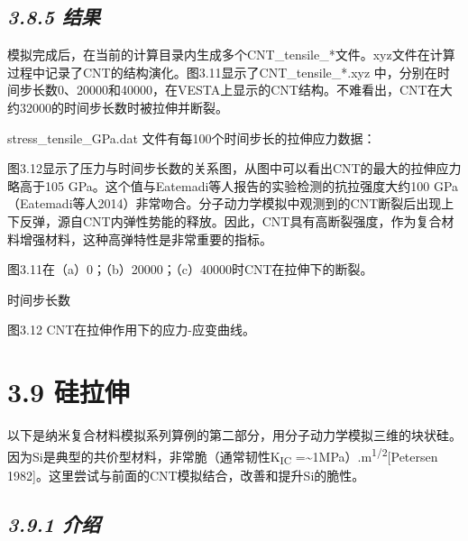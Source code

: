 
\hypertarget{ux7ed3ux679c-7}{%
\subsection{\texorpdfstring{\emph{3.8.5
结果}}{3.8.5 结果}}\label{ux7ed3ux679c-7}}

模拟完成后，在当前的计算目录内生成多个CNT\_tensile\_*文件。xyz文件在计算过程中记录了CNT的结构演化。图3.11显示了CNT\_tensile\_*.xyz
中，分别在时间步长数0、20000和40000，在VESTA上显示的CNT结构。不难看出，CNT在大约32000的时间步长数时被拉伸并断裂。

stress\_tensile\_GPa.dat 文件有每100个时间步长的拉伸应力数据：


图3.12显示了压力与时间步长数的关系图，从图中可以看出CNT的最大的拉伸应力略高于105
GPa。这个值与Eatemadi等人报告的实验检测的抗拉强度大约100
GPa（Eatemadi等人2014）非常吻合。分子动力学模拟中观测到的CNT断裂后出现上下反弹，源自CNT内弹性势能的释放。因此，CNT具有高断裂强度，作为复合材料增强材料，这种高弹特性是非常重要的指标。


图3.11在（a）0；（b）20000；（c）40000时CNT在拉伸下的断裂。


时间步长数

图3.12 CNT在拉伸作用下的应力-应变曲线。

\hypertarget{ux7845ux62c9ux4f38}{%
\section{3.9 硅拉伸}\label{ux7845ux62c9ux4f38}}

以下是纳米复合材料模拟系列算例的第二部分，用分子动力学模拟三维的块状硅。因为Si是典型的共价型材料，非常脆（通常韧性K\textsubscript{IC}
=\textasciitilde1MPa）.m\textsuperscript{1/2}{[}Petersen
1982{]}。这里尝试与前面的CNT模拟结合，改善和提升Si的脆性。

\hypertarget{ux4ecbux7ecd}{%
\subsection{\texorpdfstring{\emph{3.9.1
介绍}}{3.9.1 介绍}}\label{ux4ecbux7ecd}}

